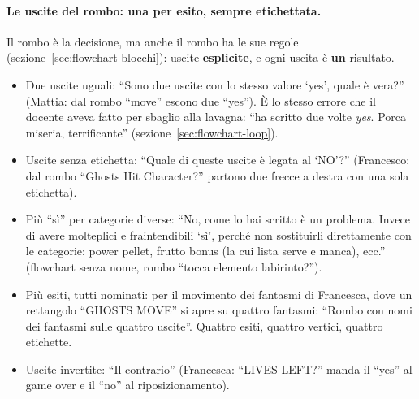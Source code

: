 \paragraph{Le uscite del rombo: una per esito, sempre etichettata.} Il rombo è
la decisione, ma anche il rombo ha le sue regole (sezione~\ref{sec:flowchart-blocchi}):
uscite \textbf{esplicite}, e ogni uscita è \textbf{un} risultato.
\begin{itemize}
  \item Due uscite uguali: ``Sono due uscite con lo stesso valore `yes', quale
        è vera?'' (Mattia: dal rombo ``move'' escono due ``yes''). È lo stesso
        errore che il docente aveva fatto per sbaglio alla lavagna: ``ha
        scritto due volte \emph{yes}. Porca miseria, terrificante''
        (sezione~\ref{sec:flowchart-loop}).
  \item Uscite senza etichetta: ``Quale di queste uscite è legata al `NO'?''
        (Francesco: dal rombo ``Ghosts Hit Character?'' partono due frecce
        a destra con una sola etichetta).
  \item Più ``sì'' per categorie diverse: ``No, come lo hai scritto è un
        problema. Invece di avere molteplici e fraintendibili `sì', perché non
        sostituirli direttamente con le categorie: power pellet, frutto bonus
        (la cui lista serve e manca), ecc.'' (flowchart senza nome, rombo
        ``tocca elemento labirinto?'').
  \item Più esiti, tutti nominati: per il movimento dei fantasmi di Francesca,
        dove un rettangolo ``GHOSTS MOVE'' si apre su quattro fantasmi:
        ``Rombo con nomi dei fantasmi sulle quattro uscite''. Quattro esiti,
        quattro vertici, quattro etichette.
  \item Uscite invertite: ``Il contrario'' (Francesca: ``LIVES LEFT?'' manda il
        ``yes'' al game over e il ``no'' al riposizionamento).
\end{itemize}

